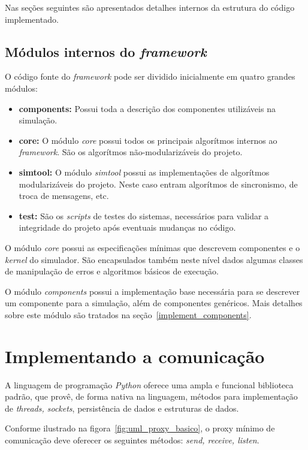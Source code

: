 Nas seções seguintes são apresentados detalhes internos da estrutura do código implementado. 

\subsection{Módulos internos do \emph{framework}}

O código fonte do \textit{framework} pode ser dividido inicialmente em quatro grandes módulos:

\begin{itemize}
\item \textbf{components:} Possui toda a descrição dos componentes utilizáveis na simulação.
\item \textbf{core:} O módulo \textit{core} possui todos os principais algorítmos internos ao \textit{framework}. São os algorítmos não-modularizáveis do projeto.
\item \textbf{simtool:} O módulo \textit{simtool} possui as implementações de algorítmos modularizáveis do projeto. Neste caso entram algorítmos de sincronismo, de troca de mensagens, etc.
\item \textbf{test:} São os \textit{scripts} de testes do sistemas, necessários para validar a integridade do projeto após eventuais mudanças no código.
\end{itemize}

O módulo \textit{core} possui as especificações mínimas que descrevem componentes e o \textit{kernel} do simulador. São encapsulados também neste nível dados algumas classes de manipulação de erros e algoritmos básicos de execução.

O módulo \textit{components} possui a implementação base necessária para se descrever um componente para a simulação, além de componentes genéricos. Mais detalhes sobre este módulo são tratados na seção~\ref{implement_components}.

\section{Implementando a comunicação}

A linguagem de programação \textit{Python} oferece uma ampla e funcional biblioteca padrão, que provê, de forma nativa na linguagem, métodos para implementação de \textit{threads, sockets}, persistência de dados e estruturas de dados.

Conforme ilustrado na figora~\ref{fig:uml_proxy_basico}, o proxy mínimo de comunicação deve oferecer os seguintes métodos: \textit{send, receive, listen}.

